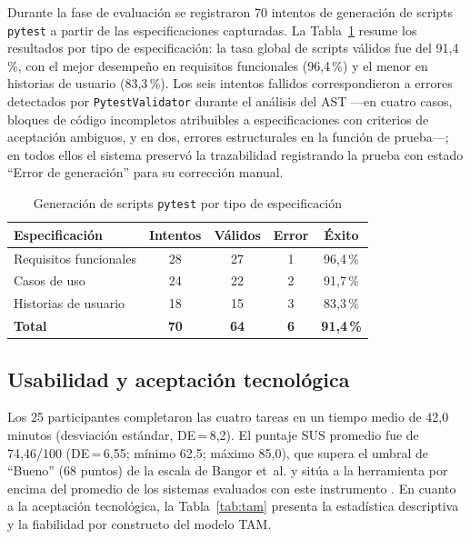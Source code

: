 \documentclass[10pt,journal,twoside,letterpaper]{IEEEtran}
\begin{document}
    Durante la fase de evaluación se registraron 70 intentos de generación de scripts \texttt{pytest} a partir de las especificaciones capturadas. La Tabla~\ref{tab:generacion} resume los resultados por tipo de especificación: la tasa global de scripts válidos fue del 91,4\,\%, con el mejor desempeño en requisitos funcionales (96,4\,\%) y el menor en historias de usuario (83,3\,\%). Los seis intentos fallidos correspondieron a errores detectados por \texttt{PytestValidator} durante el análisis del AST ---en cuatro casos, bloques de código incompletos atribuibles a especificaciones con criterios de aceptación ambiguos, y en dos, errores estructurales en la función de prueba---; en todos ellos el sistema preservó la trazabilidad registrando la prueba con estado ``Error de generación'' para su corrección manual.
    
    \begin{table}[!tb]
        \caption{Generación de scripts \texttt{pytest} por tipo de especificación}
        \label{tab:generacion}
        \centering
        \small
        \begin{tabular}{@{}lcccc@{}}
            \toprule
            \textbf{Especificación} & \textbf{Intentos} & \textbf{Válidos} & \textbf{Error} & \textbf{Éxito} \\
            \midrule
            Requisitos funcionales & 28 & 27 & 1 & 96,4\,\% \\
            Casos de uso           & 24 & 22 & 2 & 91,7\,\% \\
            Historias de usuario   & 18 & 15 & 3 & 83,3\,\% \\
            \midrule
            \textbf{Total}         & \textbf{70} & \textbf{64} & \textbf{6} & \textbf{91,4\,\%} \\
            \bottomrule
        \end{tabular}
    \end{table}
    
    \subsection{Usabilidad y aceptación tecnológica}
    \label{subsec:sustam}
    
    Los 25 participantes completaron las cuatro tareas en un tiempo medio de 42,0 minutos (desviación estándar, DE\,=\,8,2). El puntaje SUS promedio fue de 74,46/100 (DE\,=\,6,55; mínimo 62,5; máximo 85,0), que supera el umbral de ``Bueno'' (68 puntos) de la escala de Bangor et~al. y sitúa a la herramienta por encima del promedio de los sistemas evaluados con este instrumento \cite{bangor2009sus}. En cuanto a la aceptación tecnológica, la Tabla~\ref{tab:tam} presenta la estadística descriptiva y la fiabilidad por constructo del modelo TAM.
    
\end{document}
